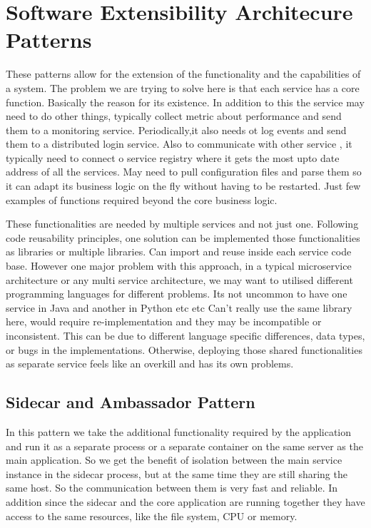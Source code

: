 \section{Software Extensibility Architecure Patterns}

These patterns allow for the extension of the functionality and the capabilities of a system.
The problem we are trying to solve here is that each service has a core function.
Basically the reason for its existence.
In addition to this the service may need to do other things, typically collect metric about performance and send them to a monitoring service.
Periodically,it also needs ot log events and send them to a distributed login service.
Also to communicate with other service , it typically need to connect o service registry where it gets the most upto date address of all the services.
May need to pull configuration files and parse them so it can adapt its business logic on the fly without having to be restarted.
Just few examples of functions required beyond the core business logic.

These functionalities are needed by multiple services and not just one.
Following code reusability principles, one solution can be implemented those functionalities as libraries or multiple libraries.
Can import and reuse inside each service code base.
However one major problem with this approach, in a typical microservice architecture or any multi service architecture, we may want to utilised different programming languages for different problems.
Its not uncommon to have one service in Java and another in Python etc etc
Can't really use the same library here, would require re-implementation and they may be incompatible or inconsistent.
This can be due to different language specific differences, data types, or bugs in the implementations.
Otherwise, deploying those shared functionalities as separate service feels like an overkill and has its own problems.

\subsection{Sidecar and Ambassador Pattern}
In this pattern we take the additional functionality required by the application and run it as a separate process or a separate container on the same server as the main application.
So we get the benefit of isolation between the main service instance in the sidecar process, but at the same time they are still sharing the same host.
So the communication between them is very fast and reliable.
In addition since the sidecar and the core application are running together they have access to the same resources, like the file system, CPU or memory.

